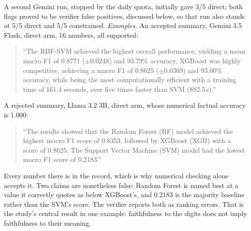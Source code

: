 \documentclass[conference]{IEEEtran}
\begin{document}
A second Gemini run, stopped by the daily quota, initially gave 3/5 direct; both flags proved to be verifier false positives, discussed below, so that run also stands at 5/5 direct and 5/5 constrained. \emph{Examples.} An accepted summary, Gemini 3.5 Flash, direct arm, 16 numbers, all supported:

\begin{quote}\footnotesize
``The RBF-SVM achieved the highest overall performance, yielding a mean macro F1 of 0.8771 ($\pm$0.0248) and 93.79\% accuracy. XGBoost was highly competitive, achieving a macro F1 of 0.8625 ($\pm$0.0369) and 93.00\% accuracy, while being the most computationally efficient with a training time of 161.4 seconds, over five times faster than SVM (882.5\,s).''
\end{quote}

A rejected summary, Llama 3.2 3B, direct arm, whose numerical factual accuracy is 1.000:

\begin{quote}\footnotesize
``The results showed that the Random Forest (RF) model achieved the highest macro F1 score of 0.8353, followed by XGBoost (XGB) with a score of 0.8625. The Support Vector Machine (SVM) model had the lowest macro F1 score of 0.2183.''
\end{quote}

Every number there is in the record, which is why numerical checking alone accepts it. Two claims are nonetheless false: Random Forest is named best at a value it correctly quotes as below XGBoost's, and 0.2183 is the majority baseline rather than the SVM's score. The verifier reports both as ranking errors. That is the study's central result in one example: faithfulness to the digits does not imply faithfulness to their meaning.
\end{document}
